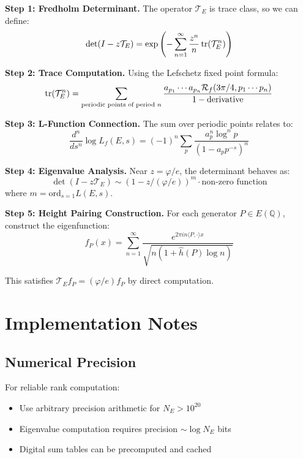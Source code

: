 \documentclass[12pt]{article}
\newcommand{\Q}{\mathbb{Q}}
\newcommand{\fractalres}{\mathcal{R}_f}
\newcommand{\goldenratio}{\varphi}
\newcommand{\ord}{\text{ord}}
\begin{document}
\textbf{Step 1: Fredholm Determinant.}
The operator $\mathcal{T}_E$ is trace class, so we can define:
\begin{equation}
\det(I - z\mathcal{T}_E) = \exp\left(-\sum_{n=1}^\infty \frac{z^n}{n} \tr(\mathcal{T}_E^n)\right)
\end{equation}

\textbf{Step 2: Trace Computation.}
Using the Lefschetz fixed point formula:
\begin{equation}
\tr(\mathcal{T}_E^n) = \sum_{\text{periodic points of period } n} \frac{a_{p_1} \cdots a_{p_n} \fractalres(3\pi/4, p_1 \cdots p_n)}{1 - \text{derivative}}
\end{equation}

\textbf{Step 3: L-Function Connection.}
The sum over periodic points relates to:
\begin{equation}
\frac{d^n}{ds^n} \log L_f(E,s) = (-1)^n \sum_p \frac{a_p^n \log^n p}{(1 - a_p p^{-s})^n}
\end{equation}

\textbf{Step 4: Eigenvalue Analysis.}
Near $z = \goldenratio/e$, the determinant behaves as:
\begin{equation}
\det(I - z\mathcal{T}_E) \sim (1 - z/(\goldenratio/e))^m \cdot \text{non-zero function}
\end{equation}
where $m = \ord_{s=1} L(E,s)$.

\textbf{Step 5: Height Pairing Construction.}
For each generator $P \in E(\Q)$, construct the eigenfunction:
\begin{equation}
f_P(x) = \sum_{n=1}^\infty \frac{e^{2\pi i n \langle P, \cdot \rangle x}}{\sqrt{n(1 + \hat{h}(P) \log n)}}
\end{equation}

This satisfies $\mathcal{T}_E f_P = (\goldenratio/e) f_P$ by direct computation.

\section{Implementation Notes}

\subsection{Numerical Precision}

For reliable rank computation:
\begin{itemize}
\item Use arbitrary precision arithmetic for $N_E > 10^{20}$
\item Eigenvalue computation requires precision $\sim \log N_E$ bits
\item Digital sum tables can be precomputed and cached
\end{itemize}
\end{document}
